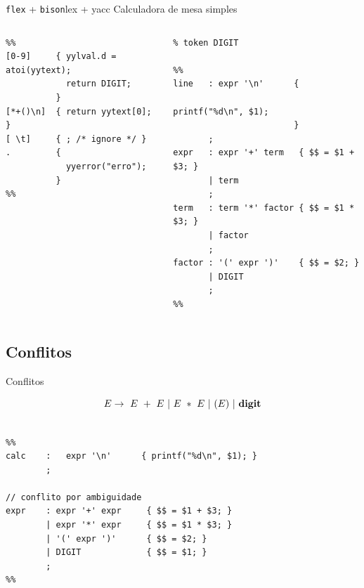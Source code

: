 \begin{frame}[fragile]{{\tt flex} + {\tt bison}}{lex + yacc}
  {\hfil\color{gray} Calculadora de mesa simples}\bigskip

  \begin{columns}
    \begin{column}{.45\textwidth}\scriptsize
\begin{lstlisting}
%%
[0-9]     { yylval.d = atoi(yytext);
            return DIGIT;
          }
[*+()\n]  { return yytext[0]; }
[ \t]     { ; /* ignore */ }
.         {
            yyerror("erro");
          }
%%
\end{lstlisting}
\end{column}\scriptsize
\begin{column}{.53\textwidth}
\begin{lstlisting}
% token DIGIT

%%
line   : expr '\n'      {
                         printf("%d\n", $1);
                        }
       ;
expr   : expr '+' term   { $$ = $1 + $3; }
       | term
       ;
term   : term '*' factor { $$ = $1 * $3; }
       | factor
       ;
factor : '(' expr ')'    { $$ = $2; }
       | DIGIT
       ;
%%
      \end{lstlisting}
    \end{column}
  \end{columns}
\end{frame}

\subsection{Conflitos}

\frame{\tableofcontents[currentsubsection]}

\begin{frame}[fragile]{Conflitos}

  $$E \rightarrow\ E\ +\ E\ |\ E\ *\ E\ |\ (E)\ |\ \text{\bf digit} $$

  \small

\begin{lstlisting}

%%
calc    :   expr '\n'      { printf("%d\n", $1); }
        ;

// conflito por ambiguidade
expr    : expr '+' expr     { $$ = $1 + $3; }
        | expr '*' expr     { $$ = $1 * $3; }
        | '(' expr ')'      { $$ = $2; }
        | DIGIT             { $$ = $1; }
        ;
%%

\end{lstlisting}
\end{frame}

